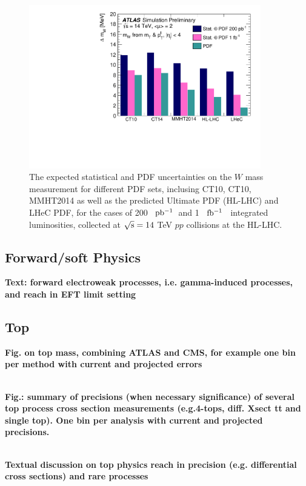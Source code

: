\documentclass{article}
\newcommand*{\fbinv}{\ensuremath{{\rm fb^{-1}}}\xspace}
\newcommand*{\pbinv}{\ensuremath{{\rm pb^{-1}}}\xspace}
\begin{document}
\begin{figure}
\centering
\includegraphics[width=0.9\textwidth]{Wmass_fig_06.pdf}
\caption{\label{Fig:Wmass} The expected statistical and PDF uncertainties on the $W$ mass measurement for different PDF sets, inclusing CT10, CT10, MMHT2014 as well as the predicted Ultimate PDF (HL-LHC) and LHeC PDF,  for the cases of 200 ~\pbinv ~and 1 ~\fbinv~  integrated luminosities, collected at ${\rm \sqrt{s}=14}$ TeV $pp$ collisions at the HL-LHC.}
\end{figure}


\subsection{Forward/soft Physics}

{\bf Text: forward electroweak processes, i.e. gamma-induced processes, and reach in EFT limit setting}

\subsection{Top}


{\bf Fig. on top mass, combining ATLAS and CMS, for example one bin per method with current and projected errors}


\\
{\bf Fig.: summary of precisions (when necessary significance) of several top process cross section measurements (e.g.4-tops, diff. Xsect tt and single top). One bin per analysis with current and projected precisions.}


\\
{\bf Textual discussion on top physics reach in precision (e.g. differential cross sections) and rare processes}
\end{document}
